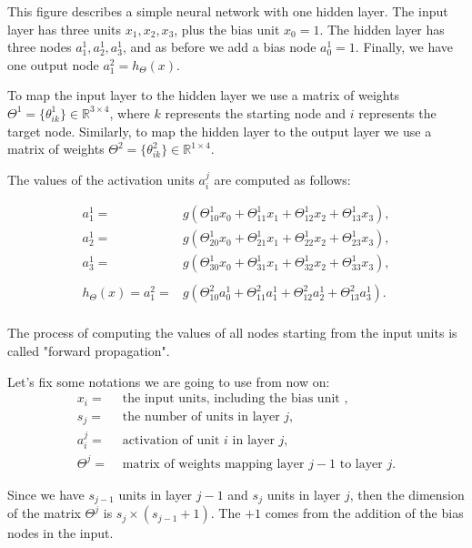 \documentclass[a4paper,11pt]{report}
\begin{document}
This figure describes a simple neural network with one hidden layer. The input layer has three units $x_1, x_2, x_3$, plus the bias unit $x_0=1$. The hidden layer has three nodes $a^1_1, a^1_2, a^1_3$, and as before we add a bias node $a^1_0=1$. Finally, we have one output node $a^2_1 = h_\Theta(x)$.

To map the input layer to the hidden layer we use a matrix of weights $\Theta^1 = \{\theta^1_{ik}\}\in\mathbb{R}^{3\times 4}$, where $k$ represents the starting node and $i$ represents the target node. Similarly, to map the hidden layer to the output layer we use a matrix of weights $\Theta^2 = \{\theta^2_{ik}\}\in\mathbb{R}^{1\times 4}$.

The values of the activation units $a^j_i$ are computed as follows:

\begin{equation}\label{eq:nn-act-nod}
\begin{split}
a_1^{1} = & g(\Theta_{10}^{1}x_0 + \Theta_{11}^{1}x_1 + \Theta_{12}^{1}x_2 + \Theta_{13}^{1}x_3), \\
a_2^{1} = & g(\Theta_{20}^{1}x_0 + \Theta_{21}^{1}x_1 + \Theta_{22}^{1}x_2 + \Theta_{23}^{1}x_3), \\
a_3^{1} = & g(\Theta_{30}^{1}x_0 + \Theta_{31}^{1}x_1 + \Theta_{32}^{1}x_2 + \Theta_{33}^{1}x_3), \\
& \\
h_\Theta(x) =  a_1^{2} = & g(\Theta_{10}^{2}a_0^{1} + \Theta_{11}^{2}a_1^{1} + \Theta_{12}^{2}a_2^{1} + \Theta_{13}^{2}a_3^{1}). \\
\end{split}
\end{equation}

The process of computing the values of all nodes starting from the input units is called "forward propagation".

Let's fix some notations we are going to use from now on:
\begin{align*}
x_i = & \text{ the input units, including the bias unit }, \\
s_j = & \text{ the number of units in layer $j$}, \\
a_i^j = & \text{ activation of unit $i$ in layer $j$}, \\
\Theta^j = & \text{ matrix of weights mapping layer $j-1$ to layer $j$}.
\end{align*}

Since we have $s_{j-1}$ units in layer $j-1$ and $s_{j}$ units in layer $j$, then the dimension of the matrix $\Theta^j$  is $s_{j}\times (s_{j-1}+1)$. The $+1$ comes from the addition of the bias nodes in the input.
\end{document}
